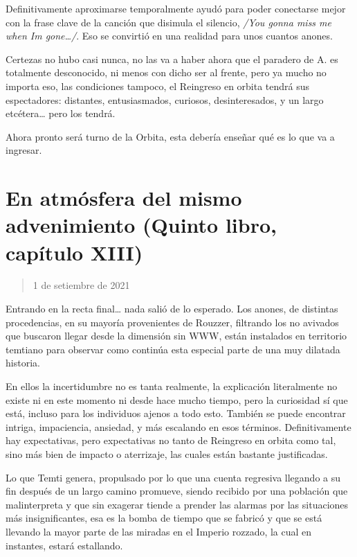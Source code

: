 \documentclass[
  spanish,
]{book}
\begin{document}
Definitivamente aproximarse temporalmente ayudó para poder conectarse mejor con la frase clave de la canción que disimula el silencio, \emph{/You gonna miss me when Im gone\ldots/}. Eso se convirtió en una realidad para unos cuantos anones.

Certezas no hubo casi nunca, no las va a haber ahora que el paradero de A. es totalmente desconocido, ni menos con dicho ser al frente, pero ya mucho no importa eso, las condiciones tampoco, el Reingreso en orbita tendrá sus espectadores: distantes, entusiasmados, curiosos, desinteresados, y un largo etcétera\ldots{} pero los tendrá.

Ahora pronto será turno de la Orbita, esta debería enseñar qué es lo que va a ingresar.

\hypertarget{en-atmuxf3sfera-del-mismo-advenimiento-quinto-libro-capuxedtulo-xiii}{%
\section{En atmósfera del mismo advenimiento (Quinto libro, capítulo XIII)}\label{en-atmuxf3sfera-del-mismo-advenimiento-quinto-libro-capuxedtulo-xiii}}

\begin{quote}
1 de setiembre de 2021
\end{quote}

Entrando en la recta final\ldots{} nada salió de lo esperado. Los anones, de distintas procedencias, en su mayoría provenientes de Rouzzer, filtrando los no avivados que buscaron llegar desde la dimensión sin WWW, están instalados en territorio temtiano para observar como continúa esta especial parte de una muy dilatada historia.

En ellos la incertidumbre no es tanta realmente, la explicación literalmente no existe ni en este momento ni desde hace mucho tiempo, pero la curiosidad sí que está, incluso para los individuos ajenos a todo esto. También se puede encontrar intriga, impaciencia, ansiedad, y más escalando en esos términos. Definitivamente hay expectativas, pero expectativas no tanto de Reingreso en orbita como tal, sino más bien de impacto o aterrizaje, las cuales están bastante justificadas.

Lo que Temti genera, propulsado por lo que una cuenta regresiva llegando a su fin después de un largo camino promueve, siendo recibido por una población que malinterpreta y que sin exagerar tiende a prender las alarmas por las situaciones más insignificantes, esa es la bomba de tiempo que se fabricó y que se está llevando la mayor parte de las miradas en el Imperio rozzado, la cual en instantes, estará estallando.
\end{document}
